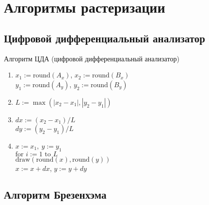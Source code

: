 \documentclass[10pt]{beamer}
\begin{document}
	
	\section{Алгоритмы растеризации}
	
	\frame{\sectionpage}
	
	\subsection{Цифровой дифференциальный анализатор}
	
	\begin{frame}{Алгоритм ЦДА (цифровой дифференциальный анализатор)}
		{
		}
		{
			\small
			\begin{enumerate}
				\item<+-> $x_1:=\text{round}(A_x)$, $x_2:=\text{round}(B_x)$\\				
					  $y_1:=\text{round}(A_y)$, $y_2:=\text{round}(B_y)$\\
					  
					  
				\item<+-> $L:=\max(|x_2-x_1|,|y_2-y_1|)$
				
				\item<+-> $dx:=(x_2-x_1)/L$\\
				      $dy:=(y_2-y_1)/L$
				      
				\item <+->	$x:=x_1,\ y:=y_1$\\						
						$\text{for }i:=1 \text{ to } L$\\
						\quad $\text{draw}(\text{round}(x),\text{round}(y))$\\
						\quad $x:=x+dx$, $y:=y+dy$ \\
						
			\end{enumerate}
		}
	\end{frame}
	
	\subsection{Алгоритм Брезенхэма}
	
\end{document}
